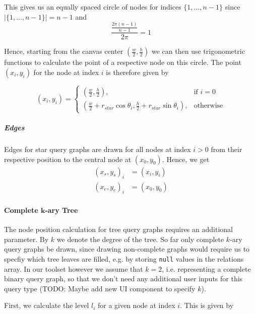 This gives us an equally spaced circle of nodes for indices $\{1,\dots,n-1\}$ since $\vert\{1,...,n-1\}\vert = n-1$ and
\begin{equation}
    \frac{\frac{2\pi(n-1)}{n-1}}{2\pi} = 1   
\end{equation}

Hence, starting from the canvas center $(\frac{w}{2}, \frac{h}{2})$ we can then use trigonometric functions to calculate the point of a respective node on this circle.
The point $(x_i, y_i)$ for the node at index $i$ is therefore given by

\begin{equation}
    (x_i, y_i) = 
    \begin{cases}
        (\frac{w}{2}, \frac{h}{2}),& \text{if } i = 0\\
        (\frac{w}{2} + r_{star}\cos{\theta_i}, \frac{h}{2} + r_{star}\sin{\theta_i}), & \text{otherwise}
    \end{cases}
\end{equation}

\subparagraph{Edges}
Edges for star query graphs are drawn for all nodes at index $i > 0$ from their respective position to the central node at $(x_0, y_0)$. Hence, we get 
\begin{equation}
    \begin{aligned}
        (x_s, y_s)_i &= (x_i, y_i)\\   
        (x_e, y_e)_i &= (x_{0}, y_{0})
    \end{aligned}
\end{equation}

\paragraph{Complete $\mathbf{k}$-ary Tree}

The node position calculation for tree query graphs requires an additional parameter. 
By $k$ we denote the degree of the tree. So far only complete $k$-ary query graphs be drawn, since drawing non-complete graphs would require us to specfiy which tree leaves are filled, e.g. by storing \texttt{null} values in the relations array. In our toolset however we assume that $k = 2$, i.e. representing a complete binary query graph, so that we don't need any additional user inputs for this query type (TODO: Maybe add new UI component to specify $k$).

First, we calculate the level $l_i$ for a given node at index $i$. This is given by

